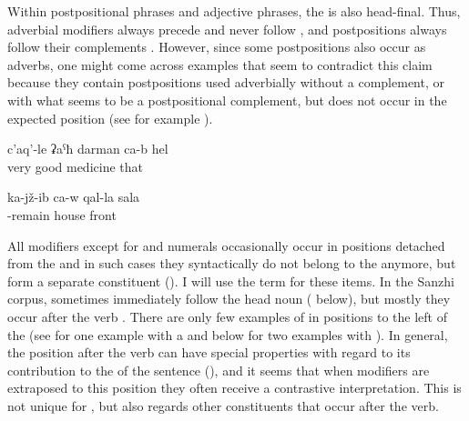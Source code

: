 Within postpositional phrases and adjective phrases, the  is also head-final. Thus, adverbial modifiers always precede and never follow  , and postpositions always follow their complements . However, since some postpositions also occur as adverbs, one might come across examples that seem to contradict this claim because they contain postpositions used adverbially without a complement, or with what seems to be a postpositional complement, but does not occur in the expected position (see  for example ).
%
\begin{exe}
	\ex	\label{ex:That is a very good medicine}
	\gll	c'aq'-le	ʡaˁħ	darman	ca-b	hel\\
		very	good	medicine		that\\
	\glt	{}

	\ex	\label{ex:He is sitting in front of the house}
	\gll	ka-jž-ib	ca-w	qal-la	sala\\
		-remain		house	front\\
	\glt	{}
\end{exe}

All modifiers except for  and numerals occasionally occur in positions detached from the  and in such cases they syntactically do not belong to the  anymore, but form a separate constituent (). I will use the term  for these items. In the Sanzhi corpus,  sometimes immediately follow the head noun ( below), but mostly they occur after the verb . There are only few examples of  in positions to the left of the  (see  for one example with a  and  below for two examples with ). In general, the position after the verb can have special properties with regard to its contribution to the  of the sentence (), and it seems that when modifiers are extraposed to this position they often receive a contrastive interpretation. This is not unique for , but also regards other constituents that occur after the verb. 

